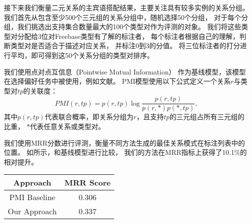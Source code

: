 接下来我们衡量二元关系的主宾语搭配结果，主要关注具有较多实例的关系分组。
我们首先从包含至少500个三元组的关系分组中，随机选择50个分组，
对于每个分组，我们挑选出支持集合数量最大的100个类型对作为评测的对象。
我们将这些类型对分配给3位对Freebase类型有了解的标注者，
每个标注者根据自己的理解，判断类型对是否适合于描述对应关系，
并标注0到3的分值。
将三位标注者的打分进行平均，即可得到这50个关系分组的类型对排序。

我们使用点对点互信息（Pointwise Mutual Information）\cite{church1990word}
作为基线模型，该模型在选择偏好任务中被使用，例如文献\parencite{resnik1996selectional}。
PMI模型使用以下公式定义一个关系$r$与类型对$tp$的关联度：
\begin{equation}
PMI(r, tp) = p(r, tp) \log \frac {p(r, tp)}{p(r, *) p(*, tp)},
\end{equation}
其中$p(r, tp)$代表联合概率，即关系分组为$r$，且支持$tp$的三元组占所有三元组的比重，
$*$代表任意关系或类型对。

我们使用MRR分数进行评测，衡量不同方法生成的最佳关系模式在标注列表中的位置。
如所示，和基线模型进行比较，
我们的方法在MRR指标上获得了10.1\%的相对提升。

\begin{table}[ht]
	\centering
	\begin{tabular}{c|c}
        \hline
		Approach & MRR Score \\
        \hline
        PMI Baseline & 0.306 \\
        Our Approach & 0.337 \\
        \hline
	\end{tabular}%
	\label{tab:tinf-mrr}%
\end{table}




